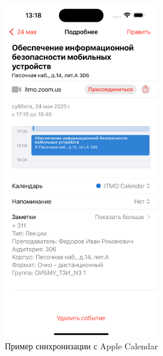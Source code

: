 \begin{figure}[h!]
    \centering
    \includegraphics[width=0.6\textwidth]{images/apple-calendar-synced.png}
    \caption{Пример синхронизации с Apple Calendar}
    \label{fig:apple-calendar}
\end{figure}
